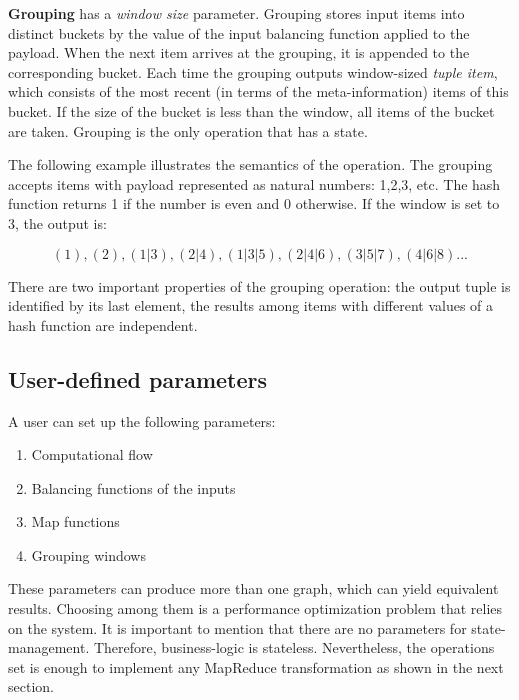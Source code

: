 {\bf Grouping} has a {\it window size} parameter. Grouping stores input items into distinct buckets by the value of the input balancing function applied to the payload. When the next item arrives at the grouping, it is appended to the corresponding bucket. Each time the grouping outputs window-sized {\it tuple item}, which consists of the most recent (in terms of the meta-information) items of this bucket. If the size of the bucket is less than the window, all items of the bucket are taken. Grouping is the only operation that has a state.

The following example illustrates the semantics of the operation. The grouping accepts items with payload represented as natural numbers: 1,2,3, etc. The hash function returns 1 if the number is even and 0 otherwise. If the window is set to 3, the output is:

\[(1), (2), (1|3), (2|4), (1|3|5), (2|4|6), (3|5|7), (4|6|8)...\]

There are two important properties of the grouping operation: the output tuple is identified by its last element, the results among items with different values of a hash function are independent.

\subsection{User-defined parameters}

A user can set up the following parameters:

\begin{enumerate}
  \item{Computational flow}
  \item{Balancing functions of the inputs}
  \item{Map functions}
  \item{Grouping windows}
\end{enumerate}

These parameters can produce more than one graph, which can yield equivalent results. Choosing among them is a performance optimization problem that relies on the system.
It is important to mention that there are no parameters for state-management. Therefore, business-logic is stateless. Nevertheless, the operations set is enough to implement any MapReduce transformation as shown in the next section.
